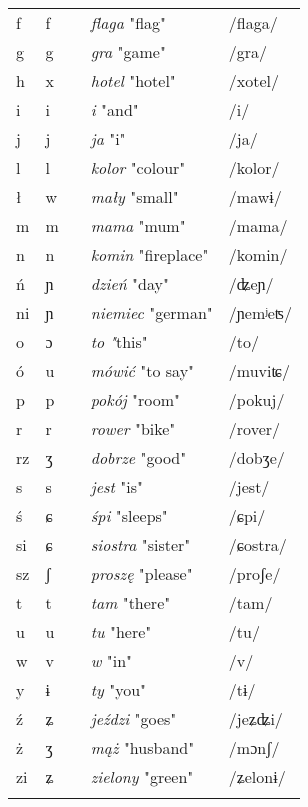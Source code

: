 \begin{table}
\begin{tabular}{lllll}
        f & f &  & \textit{flaga} "flag" & /flaga/\\
        g & g &  & \textit{gra} "game" & /gra/\\
        h & x &  & \textit{hotel} "hotel" & /xotel/\\
        i & i &  & \textit{i} "and" & /i/\\
        j & j &  & \textit{ja} "i" & /ja/\\
        l & l &  & \textit{kolor} "colour" & /kolor/\\
        ł & w &  & \textit{mały} "small" & /mawɨ/\\
        m & m &  & \textit{mama} "mum" & /mama/\\
        n & n &  & \textit{komin} "fireplace" & /komin/\\
        ń & ɲ &  & \textit{dzień} "day" & /ʥeɲ/\\
        ni & ɲ &  & \textit{niemiec} "german" & /ɲemʲeʦ/\\
        o & ɔ &  & \textit{to} \textit{"}this" & /to/\\
        ó & u &  & \textit{mówić} "to say" & /muviʨ/\\
        p & p &  & \textit{pokój} "room" & /pokuj/\\
        r & r &  & \textit{rower} "bike" & /rover/\\
        rz & ʒ &  & \textit{dobrze} "good" & /dobʒe/\\
        s & s &  & \textit{jest} "is" & /jest/\\
        ś & ɕ &  & \textit{śpi} "sleeps" & /ɕpi/\\
        si & ɕ &  & \textit{siostra} "sister" & /ɕostra/\\
        sz & ʃ &  & \textit{proszę} "please" & /proʃe/\\
        t & t &  & \textit{tam} "there" & /tam/\\
        u & u &  & \textit{tu} "here" & /tu/\\
        w & v &  & \textit{w} "in" & /v/\\
        y & ɨ &  & \textit{ty} "you" & /tɨ/\\
        ź & ʑ &  & \textit{jeździ} "goes" & /jeʑʥi/\\
        ż & ʒ &  & \textit{mąż} "husband" & /mɔnʃ/\\
        zi & ʑ &  & \textit{zielony} "green" & /ʑelonɨ/\\
        \lspbottomrule
    \end{tabular}
    \caption{\missingcaption}
    \label{tab:10.1}
\end{table}

